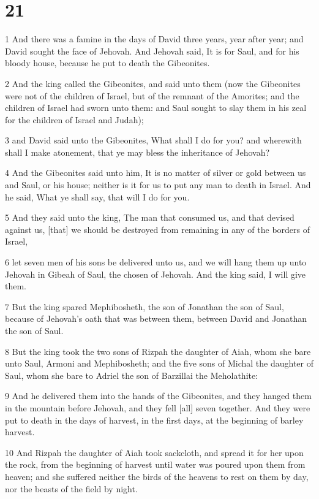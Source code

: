 \chapter{21}

\par 1 And there was a famine in the days of David three years, year after year; and David sought the face of Jehovah. And Jehovah said, It is for Saul, and for his bloody house, because he put to death the Gibeonites.
\par 2 And the king called the Gibeonites, and said unto them (now the Gibeonites were not of the children of Israel, but of the remnant of the Amorites; and the children of Israel had sworn unto them: and Saul sought to slay them in his zeal for the children of Israel and Judah);
\par 3 and David said unto the Gibeonites, What shall I do for you? and wherewith shall I make atonement, that ye may bless the inheritance of Jehovah?
\par 4 And the Gibeonites said unto him, It is no matter of silver or gold between us and Saul, or his house; neither is it for us to put any man to death in Israel. And he said, What ye shall say, that will I do for you.
\par 5 And they said unto the king, The man that consumed us, and that devised against us, [that] we should be destroyed from remaining in any of the borders of Israel,
\par 6 let seven men of his sons be delivered unto us, and we will hang them up unto Jehovah in Gibeah of Saul, the chosen of Jehovah. And the king said, I will give them.
\par 7 But the king spared Mephibosheth, the son of Jonathan the son of Saul, because of Jehovah's oath that was between them, between David and Jonathan the son of Saul.
\par 8 But the king took the two sons of Rizpah the daughter of Aiah, whom she bare unto Saul, Armoni and Mephibosheth; and the five sons of Michal the daughter of Saul, whom she bare to Adriel the son of Barzillai the Meholathite:
\par 9 And he delivered them into the hands of the Gibeonites, and they hanged them in the mountain before Jehovah, and they fell [all] seven together. And they were put to death in the days of harvest, in the first days, at the beginning of barley harvest.
\par 10 And Rizpah the daughter of Aiah took sackcloth, and spread it for her upon the rock, from the beginning of harvest until water was poured upon them from heaven; and she suffered neither the birds of the heavens to rest on them by day, nor the beasts of the field by night.
